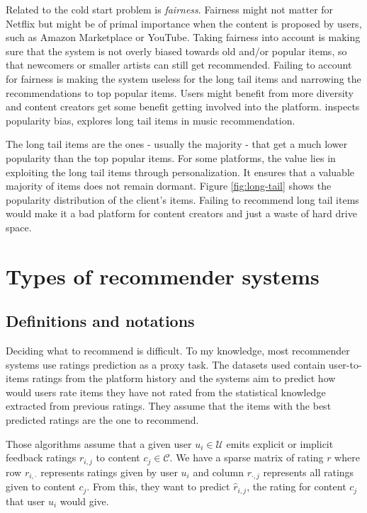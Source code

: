 Related to the cold start problem is \emph{fairness}. Fairness might not matter for Netflix but might be of primal importance when the content is proposed by users, such as Amazon Marketplace or YouTube. Taking fairness into account is making sure that the system is not overly biased towards old and/or popular items, so that newcomers or smaller artists can still get recommended. Failing to account for fairness is making the system useless for the long tail items and narrowing the recommendations to top popular items. Users might benefit from more diversity and content creators get some benefit getting involved into the platform. \cite{popularitybias} inspects popularity bias, \cite{longtail} explores long tail items in music recommendation.

The long tail items are the ones - usually the majority - that get a much lower popularity than the top popular items. For some platforms, the value lies in exploiting the long tail items through personalization. It ensures that a valuable majority of items does not remain dormant. Figure \ref{fig:long-tail} shows the popularity distribution of the client's items. Failing to recommend long tail items would make it a bad platform for content creators and just a waste of hard drive space.

\section{Types of recommender systems}

\subsection{Definitions and notations}

Deciding what to recommend is difficult. To my knowledge, most recommender systems use ratings prediction as a proxy task. The datasets used contain user-to-items ratings from the platform history and the systems aim to predict how would users rate items they have not rated from the statistical knowledge extracted from previous ratings. They assume that the items with the best predicted ratings are the one to recommend.

Those algorithms assume that a given user $u_i \in \mathcal{U}$ emits explicit or implicit feedback ratings $r_{i,j}$ to content $c_j \in \mathcal{C}$. We have a sparse matrix of rating $r$ where row $r_{i,\cdot }$ represents ratings given by user $u_i$ and column $r_{\cdot,j}$ represents all ratings given to content $c_j$. From this, they want to predict $\hat{r}_{i,j}$, the rating for content $c_j$ that user $u_i$ would give.


